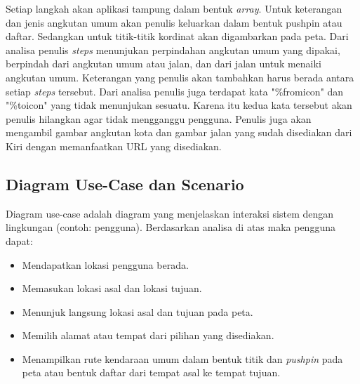 \hspace{0.5cm} Setiap langkah akan aplikasi tampung dalam bentuk \textit{array}. Untuk keterangan dan jenis angkutan umum akan penulis keluarkan dalam bentuk pushpin atau daftar. Sedangkan untuk titik-titik kordinat akan digambarkan pada peta. Dari analisa penulis \textit{steps} menunjukan perpindahan angkutan umum yang dipakai, berpindah dari angkutan umum atau jalan, dan dari jalan untuk menaiki angkutan umum. Keterangan yang penulis akan tambahkan harus berada antara setiap \textit{steps} tersebut. Dari analisa penulis juga terdapat kata "\%fromicon" dan "\%toicon" yang tidak menunjukan sesuatu. Karena itu kedua kata tersebut akan penulis hilangkan agar tidak mengganggu pengguna. Penulis juga akan mengambil gambar angkutan kota dan gambar jalan yang sudah disediakan dari Kiri dengan memanfaatkan URL yang disediakan. 

\subsection{Diagram Use-Case dan Scenario}
\label{lab:Diagram Use-Case dan Scenario}
\hspace{0.5cm} Diagram use-case adalah diagram yang menjelaskan interaksi sistem dengan lingkungan (contoh: pengguna). Berdasarkan analisa di atas maka pengguna dapat:
\begin{itemize}
	\item Mendapatkan lokasi pengguna berada.
	\item Memasukan lokasi asal dan lokasi tujuan.
	\item Menunjuk langsung lokasi asal dan tujuan pada peta.
	\item Memilih alamat atau tempat dari pilihan yang disediakan.
	\item Menampilkan rute kendaraan umum dalam bentuk titik dan \textit{pushpin} pada peta atau bentuk daftar dari tempat asal ke tempat tujuan.
\end{itemize}

